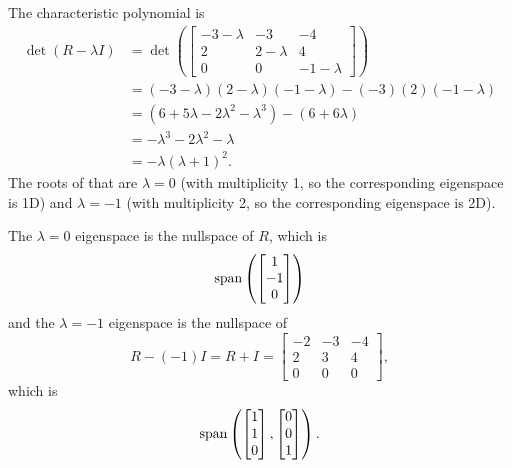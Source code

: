 \documentclass{article}
\begin{document}
\bigskip
\par
\begin{prob}
\end{prob}
The characteristic polynomial is
\begin{align*}
    \det (R - \lambda I) &= \det \left( \begin{bmatrix}
            -3-\lambda & -3 & -4 \\
            2 & 2 - \lambda & 4 \\
            0 & 0 & -1 - \lambda
    \end{bmatrix} \right) \\
                         &= (-3-\lambda)(2-\lambda)(-1-\lambda) - (-3)(2)(-1-\lambda) \\
                         &= (6+5\lambda-2\lambda^2-\lambda^3)-(6+6\lambda) \\
                         &= -\lambda^3-2\lambda^2-\lambda \\
                         &= -\lambda(\lambda+1)^2.
\end{align*}
The roots of that are $\lambda = 0$ (with multiplicity 1, so the corresponding eigenspace is 1D) and $\lambda = -1$ (with multiplicity 2, so the corresponding eigenspace is 2D).
\par
The $\lambda=0$ eigenspace is the nullspace of $R$, which is
\[ \operatorname{span} \left( \begin{bmatrix}
    1 \\
    -1 \\
    0
\end{bmatrix} \right) \]
and the $\lambda=-1$ eigenspace is the nullspace of
\[ R-(-1)I=R+I = \begin{bmatrix}
    -2 & -3 & -4 \\
    2 & 3 & 4 \\
    0 & 0 & 0
\end{bmatrix}, \]
which is
\[ \operatorname{span} \left( \begin{bmatrix}
    1 \\
    1 \\
    0
\end{bmatrix}, \begin{bmatrix}
    0 \\
    0 \\
    1
\end{bmatrix} \right). \]
\end{document}
